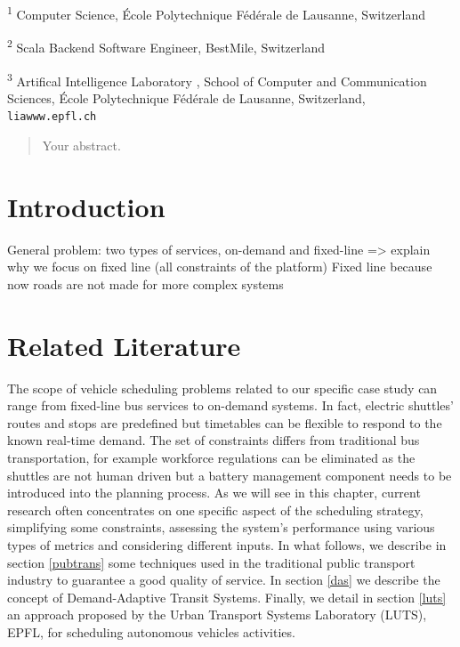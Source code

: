\documentclass[12pt,a4paper]{article}
\begin{document}
\small \textsuperscript{1} Computer Science,  \'Ecole Polytechnique F\'ed\'erale de Lausanne, Switzerland

\small \textsuperscript{2} Scala Backend Software Engineer, BestMile, Switzerland 

\small \textsuperscript{3} Artifical Intelligence Laboratory , School of Computer and Communication Sciences, \'Ecole Polytechnique F\'ed\'erale de Lausanne, Switzerland, \verb+liawww.epfl.ch+ 




\newpage


\begin{abstract}
Your abstract.
\end{abstract}

\newpage

\tableofcontents
\newpage

\section{Introduction}
General problem: two types of services, on-demand and fixed-line => explain why we focus on fixed line (all constraints of the platform) 
Fixed line because now roads are not made for more complex systems


\section{Related Literature}
The scope of vehicle scheduling problems related to our specific case study can range from fixed-line bus services to on-demand systems. In fact, electric shuttles' routes and stops are predefined but timetables can be flexible to respond to the known real-time demand. The set of constraints differs from traditional bus transportation, for example workforce regulations can be eliminated as the shuttles are not human driven but a battery management component needs to be introduced into the planning process. As we will see in this chapter, current research often concentrates on one specific aspect of the scheduling strategy, simplifying some constraints, assessing the system's performance using various types of metrics and considering different inputs. In what follows, we describe in section \ref{pubtrans} some techniques used in the traditional public transport industry to guarantee a good quality of service. In section \ref{das} we describe the concept of Demand-Adaptive Transit Systems. Finally, we detail in section \ref{luts} an approach proposed by the Urban Transport Systems Laboratory (LUTS), EPFL, for scheduling autonomous vehicles activities.  
\end{document}
